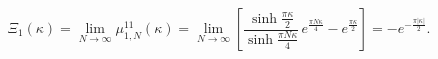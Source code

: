 \begin{equation}
\Xi_{1}(\kappa)=\lim_{N\to\infty} \mu_{1,N}^{11}(\kappa)=
\lim_{N\to\infty}\left[\frac{\sinh\frac{\pi\kappa}{2}}{\sinh\frac{\pi N\kappa}{4}}\,
e^{\frac{\pi N\kappa}{4}}-e^{\frac{\pi\kappa}{2}}\right]
=-e^{-\frac{\pi|\kappa|}{2}}.
\label{xi1}
\end{equation}


